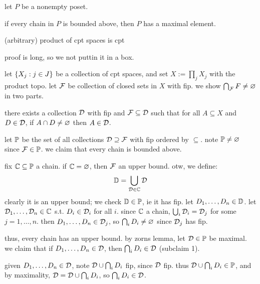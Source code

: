 \begin{thm}[title=Zorn's Lemma]
    let $P$ be a nonempty poset.

    if every chain in $P$ is bounded above, then $P$ has a maximal element.
\end{thm}

\begin{thm}[title=Tychonoff's Theorem]
    (arbitrary) product of cpt spaces is cpt
\end{thm}

proof is long, so we not puttin it in a box.

let $\left\{{X_{j}:j\in J}\right\}$ be a collection of cpt spaces, and set
$X:=\prod_{j}X_{j}$ with the product topo.
let $\mathcal{F}$ be collection of closed sets in $X$ with fip.
we show $\bigcap_{\mathcal{F}}F\neq\varnothing$ in two parts.

\vspace{0.15in}
\begin{crll}[type=Claim,num=1]
    there exists a collection $\mathcal{D}$ with fip and $\mathcal{F}\subseteq\mathcal{D}$
    such that for all $A\subseteq X$ and $D\in\mathcal{D}$, if $A\cap D\neq\varnothing$
    then $A\in\mathcal{D}$.
\end{crll}

let $\mathbb{P}$ be the set of all collections $\mathcal{D}\supseteq\mathcal{F}$ with fip
ordered by $\subseteq$.
note $\mathbb{P}\neq\varnothing$ since $\mathcal{F}\in\mathbb{P}$.
we claim that every chain is bounded above.

\begin{block}
    fix $\mathbb{C}\subseteq\mathbb{P}$ a chain.
    if $\mathbb{C}=\varnothing$, then $\mathcal{F}$ an upper bound.
    otw, we define:
    \begin{equation*}
        \mathbb{D}=\bigcup_{\mathcal{D}\in\mathbb{C}}\mathcal{D}
    \end{equation*}
    clearly it is an upper bound; we check $\mathbb{D}\in\mathbb{P}$, ie it has fip.
    let $D_{1},\dots,D_{n}\in\mathbb{D}$.
    let $\mathcal{D}_{1},\dots,\mathcal{D}_{n}\in\mathbb{C}$ s.t. $D_{i}\in\mathcal{D}_{i}$
    for all $i$.
    since $\mathbb{C}$ a chain, $\bigcup_{i}\mathcal{D}_{i}=\mathcal{D}_{j}$ for
    some $j=1,\dots,n$.
    then $D_{1},\dots,D_{n}\in\mathcal{D}_{j}$, so $\bigcap_{i}D_{i}\neq\varnothing$ since
    $\mathcal{D}_{j}$ has fip.
\end{block}

thus, every chain has an upper bound.
by zorns lemma, let $\mathcal{D}\in\mathbb{P}$ be maximal.
we claim that if $D_{1},\dots,D_{n}\in\mathcal{D}$, then $\bigcap_{i}D_{i}\in\mathcal{D}$
(subclaim 1).

\begin{block}
    given $D_{1},\dots,D_{n}\in\mathcal{D}$, note $\mathcal{D}\cup\bigcap_{i}D_{i}$ fip,
    since $\mathcal{D}$ fip.
    thus $\mathcal{D}\cup\bigcap_{i}D_{i}\in\mathbb{P}$, and by maximality,
    $\mathcal{D}=\mathcal{D}\cup\bigcap_{i}D_{i}$, so $\bigcap_{i}D_{i}\in\mathcal{D}$.
\end{block}

